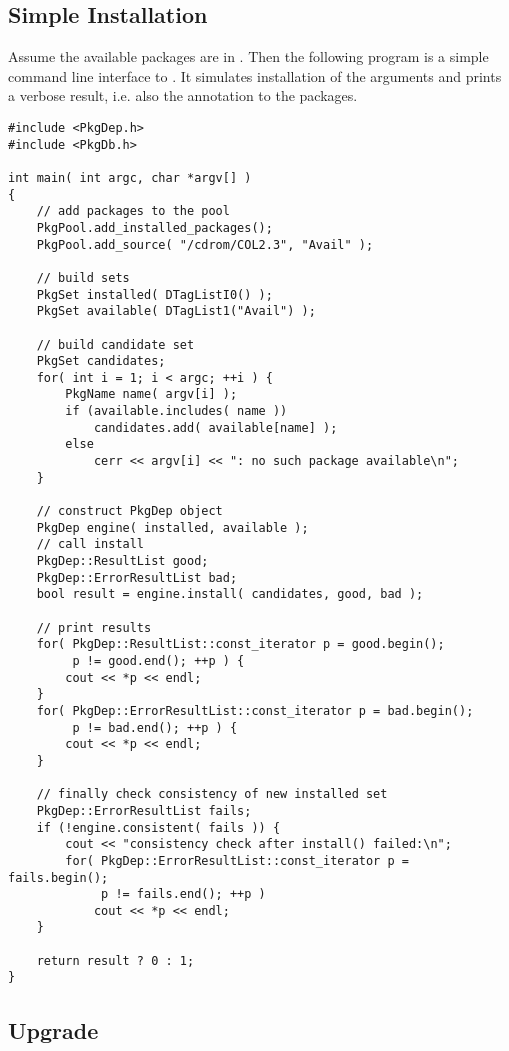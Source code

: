 \documentclass[10pt]{article}
\begin{document}
\subsection{Simple Installation}

Assume the available packages are in . Then the
following program is a simple command line interface to
. It simulates installation of the arguments and
prints a verbose result, i.e. also the annotation to the packages.

\begin{verbatim}
#include <PkgDep.h>
#include <PkgDb.h>

int main( int argc, char *argv[] )
{
    // add packages to the pool
    PkgPool.add_installed_packages();
    PkgPool.add_source( "/cdrom/COL2.3", "Avail" );

    // build sets
    PkgSet installed( DTagListI0() );
    PkgSet available( DTagList1("Avail") );

    // build candidate set
    PkgSet candidates;
    for( int i = 1; i < argc; ++i ) {
        PkgName name( argv[i] );
        if (available.includes( name ))
            candidates.add( available[name] );
        else
            cerr << argv[i] << ": no such package available\n";
    }
    
    // construct PkgDep object
    PkgDep engine( installed, available );
    // call install
    PkgDep::ResultList good;
    PkgDep::ErrorResultList bad;
    bool result = engine.install( candidates, good, bad );

    // print results    
    for( PkgDep::ResultList::const_iterator p = good.begin();
         p != good.end(); ++p ) {
        cout << *p << endl;
    }
    for( PkgDep::ErrorResultList::const_iterator p = bad.begin();
         p != bad.end(); ++p ) {
        cout << *p << endl;
    }

    // finally check consistency of new installed set
    PkgDep::ErrorResultList fails;
    if (!engine.consistent( fails )) {
        cout << "consistency check after install() failed:\n";
        for( PkgDep::ErrorResultList::const_iterator p = fails.begin();
             p != fails.end(); ++p )
            cout << *p << endl;
    }

    return result ? 0 : 1;
}
\end{verbatim}


\subsection{Upgrade}
\end{document}
